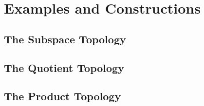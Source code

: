 \chapter{Examples and Constructions}

\addtocounter{section}{1}

\section{The Subspace Topology}



\section{The Quotient Topology}


\section{The Product Topology}


